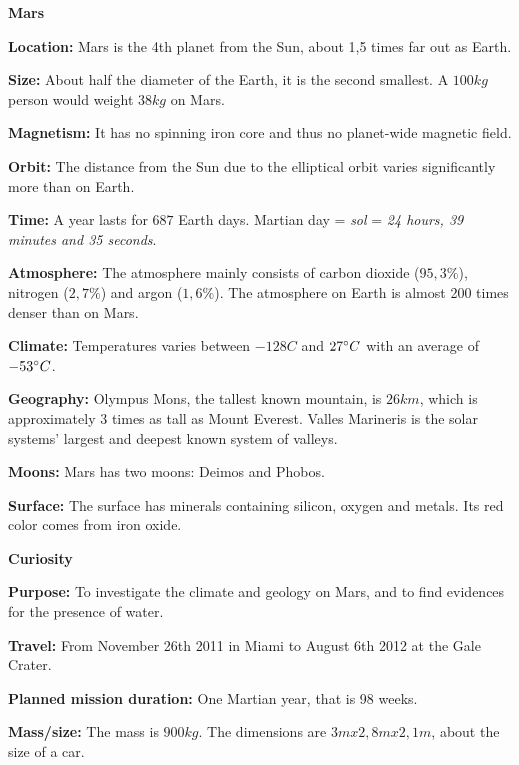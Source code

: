 \begin{tcolorbox}[colback=red!5,colframe=DarkRed!40!black,title=Mars \& Curiosity: The Red Planet and the rover]
\textbf{\large{Mars}}

\textbf{Location:} Mars is the 4th planet from the Sun, about 1,5 times far out as Earth.

\textbf{Size:} About half the diameter of the Earth, it is the second smallest.
A $100 kg$ person would weight $38 kg$ on Mars.

\textbf{Magnetism:} It has no spinning iron core and thus no planet-wide magnetic field.

\textbf{Orbit:} The distance from the Sun due to the elliptical orbit varies significantly more than on Earth.

\textbf{Time:} A year lasts for $687$ Earth days.
Martian day = \textit{sol} = \textit{24 hours, 39 minutes and 35 seconds}.

\textbf{Atmosphere:} The atmosphere mainly consists of carbon dioxide ($95,3 \%$), nitrogen ($2,7 \%$) and argon ($1,6\%$).
The atmosphere on Earth is almost 200 times denser than on Mars.

\textbf{Climate:} Temperatures varies between $-128C$ and $27 \degree C$ with an average of $-53 \degree C$.

\textbf{Geography:} Olympus Mons, the tallest known mountain, is $26 km$, which is approximately 3 times as tall as Mount Everest.
Valles Marineris is the solar systems' largest and deepest known system of valleys.

\textbf{Moons:} Mars has two moons: Deimos and Phobos.

\textbf{Surface:} The surface has minerals containing silicon, oxygen and metals.
Its red color comes from iron oxide.

\noindent\makebox[\linewidth]{\rule{\textwidth}{0.4pt}}
\vspace{0mm}

\textbf{\large{Curiosity}}

\textbf{Purpose:} To investigate the climate and geology on Mars, and to find evidences for the presence of water.

\textbf{Travel:} From November 26th 2011 in Miami to August 6th 2012 at the Gale Crater.

\textbf{Planned mission duration:} One Martian year, that is 98 weeks.

\textbf{Mass/size:} The mass is $900 kg$.
The dimensions are $3 m x 2,8 m x 2,1 m$, about the size of a car.


\end{tcolorbox}
